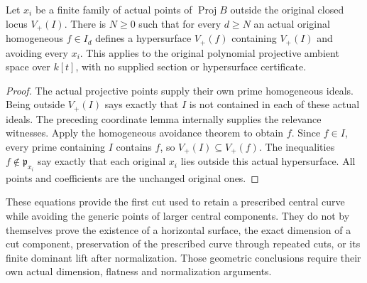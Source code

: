 \begin{corollary}
\label{cor:pl-gauss-original-projective-hypersurface-avoidance}
\leanok
Let $x_i$ be a finite family of actual points of $\operatorname{Proj}B$
outside the original closed locus $V_+(I)$. There is $N\ge0$ such that
for every $d\ge N$ an actual original homogeneous $f\in I_d$ defines a
hypersurface $V_+(f)$ containing $V_+(I)$ and avoiding every $x_i$.
This applies to the original polynomial projective ambient space over
$k[t]$, with no supplied section or hypersurface certificate.
\end{corollary}
\begin{proof}
The actual projective points supply their own prime homogeneous ideals.
Being outside $V_+(I)$ says exactly that $I$ is not contained in each
of these actual ideals. The preceding coordinate lemma internally
supplies the relevance witnesses. Apply the homogeneous avoidance
theorem to obtain $f$. Since $f\in I$, every prime containing $I$
contains $f$, so $V_+(I)\subseteq V_+(f)$. The inequalities
$f\notin\mathfrak p_{x_i}$ say exactly that each original $x_i$ lies
outside this actual hypersurface. All points and coefficients are the
unchanged original ones.
\end{proof}

These equations provide the first cut used to retain a prescribed
central curve while avoiding the generic points of larger central
components. They do not by themselves prove the existence of a
horizontal surface, the exact dimension of a cut component, preservation
of the prescribed curve through repeated cuts, or its finite dominant
lift after normalization. Those geometric conclusions require their
own actual dimension, flatness and normalization arguments.

